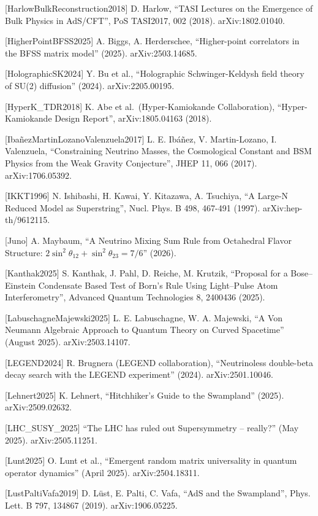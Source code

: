 \documentclass[
]{article}
\begin{document}
{[}HarlowBulkReconstruction2018{]} D. Harlow, ``TASI Lectures on the
Emergence of Bulk Physics in AdS/CFT'', PoS TASI2017, 002 (2018).
arXiv:1802.01040.

{[}HigherPointBFSS2025{]} A. Biggs, A. Herderschee, ``Higher-point
correlators in the BFSS matrix model'' (2025). arXiv:2503.14685.

{[}HolographicSK2024{]} Y. Bu et al., ``Holographic Schwinger-Keldysh
field theory of SU(2) diffusion'' (2024). arXiv:2205.00195.

{[}HyperK\_TDR2018{]} K. Abe et al.~(Hyper-Kamiokande Collaboration),
``Hyper-Kamiokande Design Report'', arXiv:1805.04163 (2018).

{[}IbañezMartinLozanoValenzuela2017{]} L. E. Ibáñez, V. Martin-Lozano,
I. Valenzuela, ``Constraining Neutrino Masses, the Cosmological Constant
and BSM Physics from the Weak Gravity Conjecture'', JHEP 11, 066 (2017).
arXiv:1706.05392.

{[}IKKT1996{]} N. Ishibashi, H. Kawai, Y. Kitazawa, A. Tsuchiya, ``A
Large-N Reduced Model as Superstring'', Nucl. Phys. B 498, 467-491
(1997). arXiv:hep-th/9612115.

{[}Juno{]} A. Maybaum, ``A Neutrino Mixing Sum Rule from Octahedral
Flavor Structure: \(2\sin^2\theta_{12} + \sin^2\theta_{23} = 7/6\)''
(2026).

{[}Kanthak2025{]} S. Kanthak, J. Pahl, D. Reiche, M. Krutzik, ``Proposal
for a Bose--Einstein Condensate Based Test of Born's Rule Using
Light--Pulse Atom Interferometry'', Advanced Quantum Technologies 8,
2400436 (2025).

{[}LabuschagneMajewski2025{]} L. E. Labuschagne, W. A. Majewski, ``A Von
Neumann Algebraic Approach to Quantum Theory on Curved Spacetime''
(August 2025). arXiv:2503.14107.

{[}LEGEND2024{]} R. Brugnera (LEGEND collaboration), ``Neutrinoless
double-beta decay search with the LEGEND experiment'' (2024).
arXiv:2501.10046.

{[}Lehnert2025{]} K. Lehnert, ``Hitchhiker's Guide to the Swampland''
(2025). arXiv:2509.02632.

{[}LHC\_SUSY\_2025{]} ``The LHC has ruled out Supersymmetry -- really?''
(May 2025). arXiv:2505.11251.

{[}Lunt2025{]} O. Lunt et al., ``Emergent random matrix universality in
quantum operator dynamics'' (April 2025). arXiv:2504.18311.

{[}LustPaltiVafa2019{]} D. Lüst, E. Palti, C. Vafa, ``AdS and the
Swampland'', Phys. Lett. B 797, 134867 (2019). arXiv:1906.05225.
\end{document}
